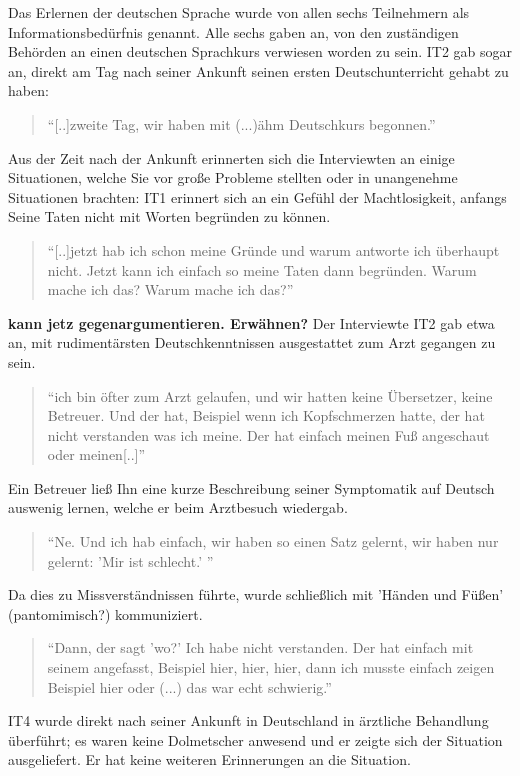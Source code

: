Das Erlernen der deutschen Sprache wurde von allen sechs Teilnehmern als Informationsbedürfnis genannt. Alle sechs gaben an, von den zuständigen Behörden an einen deutschen Sprachkurs verwiesen worden zu sein. IT2 gab sogar an, direkt am Tag nach seiner Ankunft seinen ersten Deutschunterricht gehabt zu haben:
\begin{quote}
    ``[..]zweite Tag, wir haben mit (...)ähm Deutschkurs begonnen.''
\end{quote}
Aus der Zeit nach der Ankunft erinnerten sich die Interviewten an einige Situationen, welche Sie vor große Probleme stellten oder in unangenehme Situationen brachten:\newline
IT1 erinnert sich an ein Gefühl der Machtlosigkeit, anfangs Seine Taten nicht mit Worten begründen zu können.
\begin{quote}
    ``[..]jetzt hab ich schon meine Gründe und warum antworte ich überhaupt nicht. Jetzt kann ich einfach so meine Taten dann begründen. Warum mache ich das? Warum mache ich das?''
\end{quote}
\textbf{kann jetz gegenargumentieren. Erwähnen?}
Der Interviewte IT2 gab etwa an, mit rudimentärsten Deutschkenntnissen ausgestattet zum Arzt gegangen zu sein. 
\begin{quote}
    ``ich bin öfter zum Arzt gelaufen, und wir hatten keine Übersetzer, keine Betreuer. Und der hat, Beispiel wenn ich Kopfschmerzen hatte, der hat nicht verstanden was ich meine. Der hat einfach meinen Fuß angeschaut oder meinen[..]''
\end{quote}
Ein Betreuer ließ Ihn eine kurze Beschreibung seiner Symptomatik auf Deutsch auswenig lernen, welche er beim Arztbesuch wiedergab. 
\begin{quote}
    ``Ne. Und ich hab einfach, wir haben so einen Satz gelernt, wir haben nur gelernt: 'Mir ist schlecht.' ''
\end{quote}
Da dies zu Missverständnissen führte, wurde schließlich mit 'Händen und Füßen' (pantomimisch?) kommuniziert.\newline
\begin{quote}
    ``Dann, der sagt 'wo?' Ich habe nicht verstanden. Der hat einfach mit seinem angefasst, Beispiel hier, hier, hier, dann ich musste einfach zeigen Beispiel hier oder (...) das war echt schwierig.''
\end{quote}
IT4 wurde direkt nach seiner Ankunft in Deutschland in ärztliche Behandlung überführt; es waren keine Dolmetscher anwesend und er zeigte sich der Situation ausgeliefert. Er hat keine weiteren Erinnerungen an die Situation.

